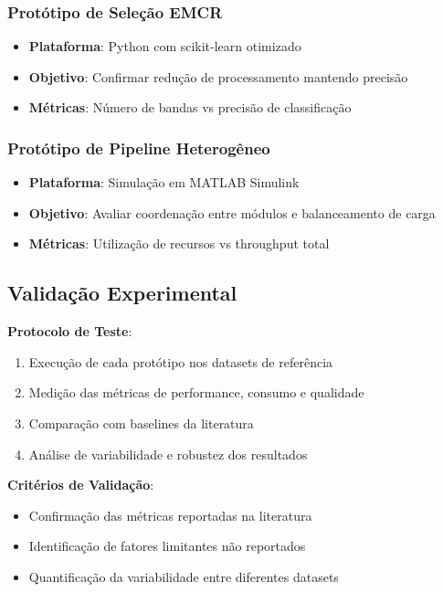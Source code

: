 \subsubsection{Protótipo de Seleção EMCR}

\begin{itemize}
\item \textbf{Plataforma}: Python com scikit-learn otimizado
\item \textbf{Objetivo}: Confirmar redução de processamento mantendo precisão
\item \textbf{Métricas}: Número de bandas vs precisão de classificação
\end{itemize}

\subsubsection{Protótipo de Pipeline Heterogêneo}

\begin{itemize}
\item \textbf{Plataforma}: Simulação em MATLAB Simulink
\item \textbf{Objetivo}: Avaliar coordenação entre módulos e balanceamento de carga
\item \textbf{Métricas}: Utilização de recursos vs throughput total
\end{itemize}

\subsection{Validação Experimental}

\textbf{Protocolo de Teste}:
\begin{enumerate}
\item Execução de cada protótipo nos datasets de referência
\item Medição das métricas de performance, consumo e qualidade
\item Comparação com baselines da literatura
\item Análise de variabilidade e robustez dos resultados
\end{enumerate}

\textbf{Critérios de Validação}:
\begin{itemize}
\item Confirmação das métricas reportadas na literatura
\item Identificação de fatores limitantes não reportados
\item Quantificação da variabilidade entre diferentes datasets
\end{itemize}

